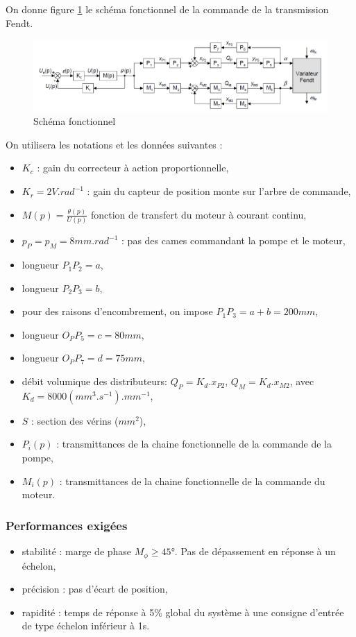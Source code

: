 On donne figure \ref{fig21} le schéma fonctionnel de la commande de la transmission Fendt.

\begin{figure}[!h]
\centering\includegraphics[width=0.8\linewidth]{img/Tracteur21.png}
\caption{Schéma fonctionnel}
\label{fig21}
\end{figure}

On utilisera les notations et les données suivantes :
\begin{itemize}
  \item $K_c$ : gain du correcteur à action proportionnelle,
  \item $K_r=2V.rad^{-1}$ : gain du capteur de position monte sur l'arbre de commande,
  \item $M(p)=\frac{\theta(p)}{U(p)}$ fonction de transfert du moteur à courant continu,
  \item $p_P=p_M=8mm.rad^{-1}$ : pas des cames commandant la pompe et le moteur,
  \item longueur $P_{1}P_{2} = a$,
  \item longueur $P_{2}P_{3} = b$,
  \item pour des raisons d'encombrement, on impose $P_{1}P_{3}=a+b=200mm$,
  \item longueur $O_{P}P_{5}=c=80mm$,
  \item longueur $O_{P}P_{7}=d=75mm$,
  \item débit volumique des distributeurs: $Q_P=K_d.x_{P2}$, $Q_M=K_d.x_{M2}$, avec $K_d=8000(mm^3.s^{-1}).mm^{-1}$,
  \item $S$ : section des vérins ($mm^2$),
  \item $P_i(p)$ : transmittances de la chaine fonctionnelle de la commande de la pompe,
  \item $M_i(p)$ : transmittances de la chaine fonctionnelle de la commande du moteur.
\end{itemize}

\subsubsection{Performances exigées}

\begin{itemize}
 \item stabilité : marge de phase $M_{\phi} \geq 45$°. Pas de dépassement en réponse à un échelon,
 \item précision : pas d'écart de position,
 \item rapidité : temps de réponse à 5\% global du système à une consigne d'entrée de type échelon inférieur à 1s.
\end{itemize}

